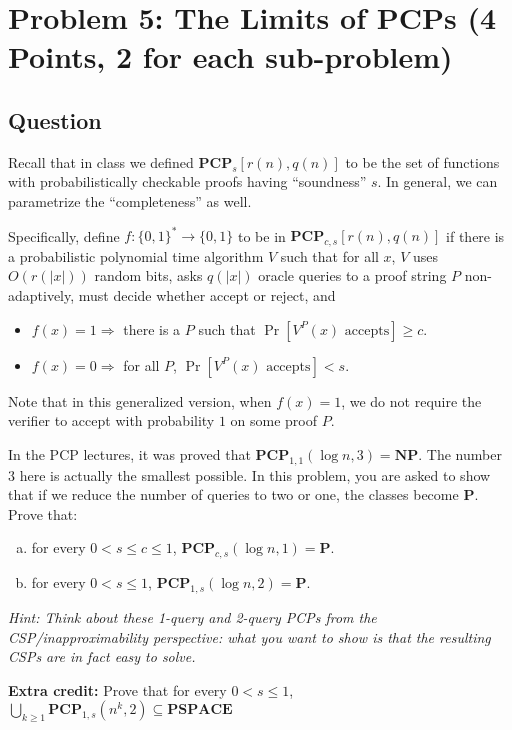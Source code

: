 \documentclass{article}
\newcommand{\mf}[1]{\mathbf{#1}}
\begin{document}
\newpage
\section*{Problem 5: The Limits of PCPs (4 Points, 2 for each sub-problem)}
\subsection*{Question}
Recall that in class we defined $\mf{PCP}_s[r(n),q(n)]$ to be the set of functions with probabilistically checkable proofs having ``soundness'' $s$. In general, we can parametrize the ``completeness'' as well. 

Specifically, define $f:\{0,1\}^* \rightarrow \{0,1\}$ to be in $\mf{PCP}_{c,s}[r(n),q(n)]$ if there is a probabilistic polynomial time algorithm $V$ such that for all $x$, $V$ uses $O(r(|x|))$ random bits, asks $q(|x|)$ oracle queries to a proof string $P$ non-adaptively, must decide whether accept or reject, and
\begin{itemize}
	\item
	$f(x) = 1 \Longrightarrow$ there is a $P$ such that $\Pr[V^P(x) \textrm{ accepts}] \geq c$.
	\item
	$f(x) = 0 \Longrightarrow$ for all $P$, $\Pr[V^P(x) \textrm{ accepts}] < s$.
\end{itemize}

Note that in this generalized version, when $f(x) = 1$, we do not require the verifier to accept with probability $1$ on some proof $P$. 

In the PCP lectures, it was proved that $\mf{PCP}_{1,1}(\log n, 3)=\mathbf{NP}$. The number $3$ here is actually the smallest possible. In this problem, you are asked to show that if we reduce the number of queries to two or one, the classes become $\mathbf{P}$. Prove that:
\begin{enumerate}[(a)]
	\item
	for every $0<s\leq  c\leq 1$, $\mf{PCP}_{c,s}(\log n,1)=\mathbf{P}$.
	\item
	for every $0<s\leq 1$, $\mf{PCP}_{1,s}(\log n,2)=\mathbf{P}$.
\end{enumerate} 
\emph{Hint: Think about these 1-query and 2-query PCPs from the CSP/inapproximability perspective: what you want to show is that the resulting CSPs are in fact easy to solve.}

\smallskip

{\bf Extra credit:} Prove that for every $0<s\leq 1$, $\bigcup_{k \geq 1} \mf{PCP}_{1,s}(n^k,2) \subseteq \mf{PSPACE}$
\end{document}
